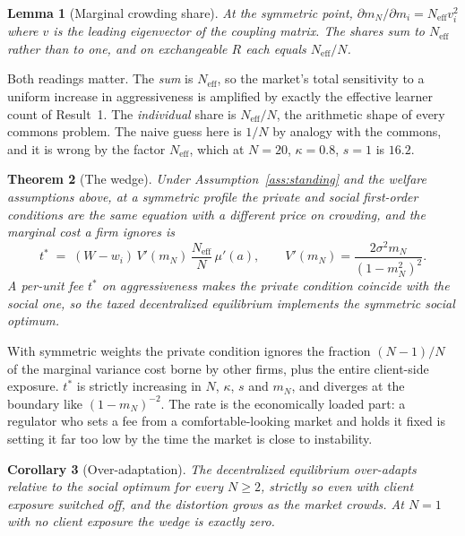 \documentclass{article}
\theoremstyle{plain}
\newtheorem{theorem}{Theorem}
\newtheorem{lemma}[theorem]{Lemma}
\newtheorem{corollary}[theorem]{Corollary}
\theoremstyle{definition}
\newcommand{\Neff}{N_{\mathrm{eff}}}
\newcommand{\mN}{m_N}
\begin{document}
\begin{lemma}[Marginal crowding share]
\label{lem:share}
At the symmetric point, $\partial \mN/\partial m_i = \Neff v_i^2$ where $v$ is the leading eigenvector of the coupling matrix. The shares sum to $\Neff$ rather than to one, and on exchangeable $R$ each equals $\Neff/N$.
\end{lemma}

Both readings matter. The \emph{sum} is $\Neff$, so the market's total sensitivity to a uniform increase in aggressiveness is amplified by exactly the effective learner count of Result~1. The \emph{individual} share is $\Neff/N$, the arithmetic shape of every commons problem. The naive guess here is $1/N$ by analogy with the commons, and it is wrong by the factor $\Neff$, which at $N=20$, $\kappa=0.8$, $s=1$ is $16.2$.

\begin{theorem}[The wedge]
\label{thm:wedge}
Under Assumption~\ref{ass:standing} and the welfare assumptions above, at a symmetric profile the private and social first-order conditions are the same equation with a different price on crowding, and the marginal cost a firm ignores is
\begin{equation}
t^{*} \;=\; (W - w_i)\, V'(\mN)\, \frac{\Neff}{N}\, \mu'(a), \qquad V'(\mN) = \frac{2\sigma^2 \mN}{(1-\mN^2)^2}.
\end{equation}
A per-unit fee $t^{*}$ on aggressiveness makes the private condition coincide with the social one, so the taxed decentralized equilibrium implements the symmetric social optimum.
\end{theorem}

With symmetric weights the private condition ignores the fraction $(N-1)/N$ of the marginal variance cost borne by other firms, plus the entire client-side exposure. $t^{*}$ is strictly increasing in $N$, $\kappa$, $s$ and $\mN$, and diverges at the boundary like $(1-\mN)^{-2}$. The rate is the economically loaded part: a regulator who sets a fee from a comfortable-looking market and holds it fixed is setting it far too low by the time the market is close to instability.

\begin{corollary}[Over-adaptation]
\label{cor:over}
The decentralized equilibrium over-adapts relative to the social optimum for every $N \geq 2$, strictly so even with client exposure switched off, and the distortion grows as the market crowds. At $N=1$ with no client exposure the wedge is exactly zero.
\end{corollary}
\end{document}
